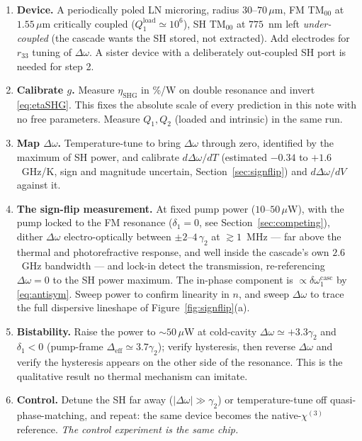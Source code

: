 \documentclass[11pt,a4paper]{article}
\newcommand{\chithree}{\chi^{(3)}}
\newcommand{\Dom}{\Delta\omega}
\newcommand{\etanorm}{\eta_{\text{SHG}}}
\begin{document}
\begin{enumerate}[leftmargin=1.8em,itemsep=3pt]
\item \textbf{Device.}  A periodically poled LN microring, radius
  $30$--$70\,\mu$m, FM TM$_{00}$ at $1.55\,\mu$m critically coupled
  ($Q_1^{\text{load}}\simeq10^6$), SH TM$_{00}$ at $775$~nm left
  \emph{under-coupled} (the cascade wants the SH stored, not extracted).
  Add electrodes for $r_{33}$ tuning of $\Dom$.  A sister device with a
  deliberately out-coupled SH port is needed for step 2.
\item \textbf{Calibrate $g$.}  Measure $\etanorm$ in \%/W on double
  resonance and invert \eqref{eq:etaSHG}.  This fixes the absolute scale
  of every prediction in this note with no free parameters.  Measure
  $Q_1,Q_2$ (loaded and intrinsic) in the same run.
\item \textbf{Map $\Dom$.}  Temperature-tune to bring $\Dom$ through
  zero, identified by the maximum of SH power, and calibrate
  $d\Dom/dT$ (estimated $-0.34$ to $+1.6$~GHz/K, sign and magnitude
  uncertain, Section~\ref{sec:signflip}) and $d\Dom/dV$ against it.
\item \textbf{The sign-flip measurement.}  At fixed pump power
  ($10$--$50\,\mu$W), with the pump locked to the FM resonance
  ($\delta_1=0$, see Section~\ref{sec:competing}), dither $\Dom$
  electro-optically between $\pm2$--$4\,\gamma_2$ at $\gtrsim1$~MHz ---
  far above the thermal and photorefractive response, and well inside
  the cascade's own $2.6$~GHz bandwidth --- and lock-in
  detect the transmission, re-referencing $\Dom=0$ to the SH power
  maximum.  The in-phase component is
  $\propto\delta\omega_1^{\text{casc}}$ by \eqref{eq:antisym}.
  Sweep power to confirm linearity in $n$, and sweep $\Dom$ to trace the
  full dispersive lineshape of Figure~\ref{fig:signflip}(a).
\item \textbf{Bistability.}  Raise the power to $\sim50\,\mu$W at
  cold-cavity $\Dom\simeq+3.3\gamma_2$ and $\delta_1<0$ (pump-frame
  $\Delta_\text{eff}\simeq3.7\gamma_2$); verify hysteresis, then
  reverse $\Dom$ and verify the hysteresis appears on the other side of
  the resonance.  This is the qualitative result no thermal mechanism
  can imitate.
\item \textbf{Control.}  Detune the SH far away ($|\Dom|\gg\gamma_2$) or
  temperature-tune off quasi-phase-matching, and repeat: the same device
  becomes the native-$\chithree$ reference.  \emph{The control experiment
  is the same chip.}
\end{enumerate}
\end{document}
